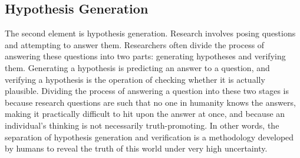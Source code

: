 


\subsection{Hypothesis Generation}
The second element is hypothesis generation. Research involves posing questions and attempting to answer them. Researchers often divide the process of answering these questions into two parts: generating hypotheses and verifying them. Generating a hypothesis is predicting an answer to a question, and verifying a hypothesis is the operation of checking whether it is actually plausible. Dividing the process of answering a question into these two stages is because research questions are such that no one in humanity knows the answers, making it practically difficult to hit upon the answer at once, and because an individual's thinking is not necessarily truth-promoting. In other words, the separation of hypothesis generation and verification is a methodology developed by humans to reveal the truth of this world under very high uncertainty.

